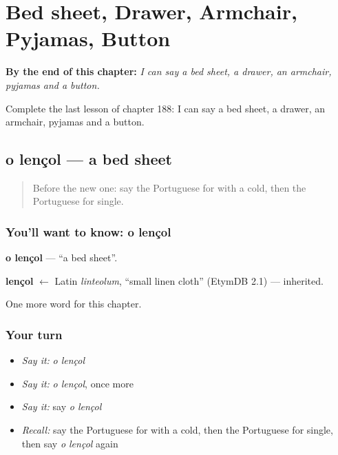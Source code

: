 
\chapter{Bed sheet, Drawer, Armchair, Pyjamas, Button}
\label{ch:pt-bed-sheet-drawer-armchair-pyjamas-button}

\begin{chapteropening}
\textbf{By the end of this chapter:} \emph{I can say a bed sheet, a drawer, an armchair, pyjamas and a button.}

Complete the last lesson of chapter 188: I can say a bed sheet, a drawer, an armchair, pyjamas and a button.
\end{chapteropening}

\section[o lençol]{o lençol — a bed sheet}

\label{lesson:PT-C188-lencol}



\begin{quote}
Before the new one: say the Portuguese for with a cold, then the Portuguese for single.
\end{quote}

\subsection*{You'll want to know: o lençol}
\textbf{o lençol} — \textquotedblleft{}a bed sheet\textquotedblright{}.

\begin{cousinweb}
\textbf{lençol} $\leftarrow$ Latin \emph{linteolum}, \textquotedblleft{}small linen cloth\textquotedblright{} (EtymDB 2.1) — inherited.
\end{cousinweb}

\begin{grammarlens}[title={What you've built}]
One more word for this chapter.
\end{grammarlens}

\subsection*{Your turn}
\begin{itemize}
\raggedright
  \item \emph{Say it:} \emph{o lençol}
  \item \emph{Say it:} \emph{o lençol}, once more
  \item \emph{Say it:} say \emph{o lençol}
  \item \emph{Recall:} say the Portuguese for with a cold, then the Portuguese for single, then say \emph{o lençol} again
\end{itemize}


